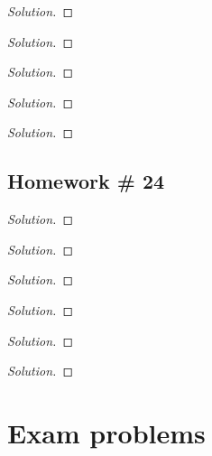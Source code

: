 \begin{problem}[WebAssign HW \# 23, \#]
\end{problem}
\begin{proof}[Solution]
\end{proof}

\begin{problem}[WebAssign HW \# 23, \#]
\end{problem}
\begin{proof}[Solution]
\end{proof}

\begin{problem}[WebAssign HW \# 23, \#]
\end{problem}
\begin{proof}[Solution]
\end{proof}

\begin{problem}[WebAssign HW \# 23, \#]
\end{problem}
\begin{proof}[Solution]
\end{proof}

\begin{problem}[WebAssign HW \# 23, \#]
\end{problem}
\begin{proof}[Solution]
\end{proof}

\section{Homework \# 24}
\begin{problem}[WebAssign HW \# 24, \#]
\end{problem}
\begin{proof}[Solution]
\end{proof}

\begin{problem}[WebAssign HW \# 24, \#]
\end{problem}
\begin{proof}[Solution]
\end{proof}

\begin{problem}[WebAssign HW \# 24, \#]
\end{problem}
\begin{proof}[Solution]
\end{proof}

\begin{problem}[WebAssign HW \# 24, \#]
\end{problem}
\begin{proof}[Solution]
\end{proof}

\begin{problem}[WebAssign HW \# 24, \#]
\end{problem}
\begin{proof}[Solution]
\end{proof}

\begin{problem}[WebAssign HW \# 24, \#]
\end{problem}
\begin{proof}[Solution]
\end{proof}

\chapter{Exam problems}

